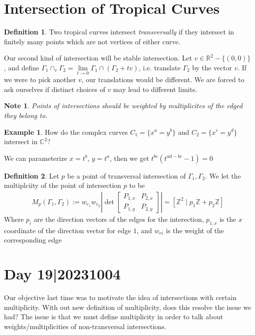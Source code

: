 \documentclass[12pt]{memoir}
\newtheorem{note}{Note}
\theoremstyle{definition}
\newtheorem{protoexample}{Example}[section]
\newenvironment{ex}
   {\begin{protoexample}}
   {\end{protoexample}}
\newtheorem{protodefinition}{Definition}[section]
\newenvironment{define}
   {\begin{protodefinition}}
   {\end{protodefinition}}
\def\ZZ{{\mathbb Z}}
\def\RR{{\mathbb R}}
\def\CC{{\mathbb C}}
\begin{document}

\section{Intersection of Tropical Curves}

\begin{define}
Two tropical curves intersect \emph{transversally} if they intersect in finitely many points which are not vertices of either curve.
\end{define}


Our second kind of intersection will be stable intersection.
Let $v \in \RR^2 -\{(0,0)\}$, and define $\Gamma_1 \cap_v \Gamma_2= \lim\limits_{t \rightarrow 0} \Gamma_1 \cap (\Gamma_2 +tv)$, i.e. translate $\Gamma_2$ by the vector $v $. If we were to pick another $v$, our translations would be different. We are forced to ask ourselves if distinct choices of $v$ may lead to different limits.


\begin{note}
    Points of intersections should be weighted by multiplicites of the edged they belong to.
\end{note}



\begin{ex}
    How do the complex curves $C_1=\{x^a=y^b\}$ and $C_2=\{x^c=y^d\}$ intersect in $\CC^2$?

        We can parameterize $x=t^b$, $y=t^a$, then we get $t^{bc}(t^{ad-bc}-1)=0$
\end{ex}


\begin{define}
    Let $p$ be a point of transversal intersection of $\Gamma_1, \Gamma_2$. We let the multiplciity of the point of intersection $p$ to be 
    \begin{align*}
        M_p(\Gamma_1, \Gamma_2):=w_{e_1}w_{e_2} \left| \det \begin{bmatrix}
            P_{1,x} &P_{2,x} \\
            P_{1,y} &P_{2,y}
        \end{bmatrix}  \right| =[\ZZ^2\;|\; p_1 \ZZ + p_2 \ZZ]
    \end{align*}
    Where $p_i$ are the direction vectors of the edges for the interection, $p_{1,x}$ is the $x$ coordinate of the direction vector for edge $1$, and $w_{ei}$ is the weight of the corresponding edge
\end{define}

\section{Day 19|20231004}
Our objective last time was to motivate the idea of intersections with certain multiplicity. With out new definition of multiplicity, does this resolve the issue we had?  The issue is that we must define multiplicity in order to talk about weights/multiplicities of non-transversal intersections.
\end{document}
